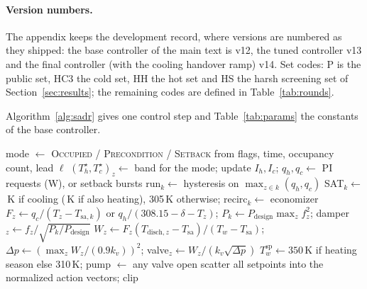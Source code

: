 \documentclass{article}
\begin{document}
\paragraph{Version numbers.} The appendix keeps the development record, where versions are numbered as they shipped: the base controller of the main text is v12, the tuned controller v13 and the final controller (with the cooling handover ramp) v14. Set codes: P is the public set, HC3 the cold set, HH the hot set and HS the harsh screening set of Section~\ref{sec:results}; the remaining codes are defined in Table~\ref{tab:rounds}.

Algorithm~\ref{alg:sadr} gives one control step and Table~\ref{tab:params} the constants of the base controller.
\begin{algorithm}[!htbp]
\caption{SADR, one step (vectorized over zones $z$ and handlers $k$)}
\label{alg:sadr}
\begin{algorithmic}[1]
\State mode $\gets$ \textsc{Occupied} / \textsc{Precondition} / \textsc{Setback} from flags, time, occupancy count, lead $\ell$
\State $(T_h^\star, T_c^\star)_z \gets$ band for the mode; update $I_h, I_c$; $q_h, q_c \gets$ PI requests (W), or setback bursts
\State run$_k \gets$ hysteresis on $\max_{z\in k}(q_h, q_c)$
\State SAT$_k \gets$ \ParSatCoolHi\,K if cooling (\ParSatMixFloor\,K if also heating), 305\,K otherwise; recirc$_k \gets$ economizer
\State $F_z \gets q_c/(T_z - T_{\text{sa},k})$ or $q_h/(308.15-\delta-T_z)$; $P_k \gets P_{\text{design}}\max_z f_z^2$; damper$_z \gets f_z/\sqrt{P_k/P_{\text{design}}}$
\State $W_z \gets F_z (T_{\text{disch},z} - T_{\text{sa}})/(T_w - T_{\text{sa}})$; $\Delta p \gets (\max_z W_z / (0.9 k_v))^2$; valve$_z \gets W_z/(k_v\sqrt{\Delta p})$
\State $T_w^{\text{sp}} \gets 350$\,K if heating season else 310\,K; pump $\gets$ any valve open
\State scatter all setpoints into the normalized action vectors; clip
\end{algorithmic}
\end{algorithm}
\end{document}
